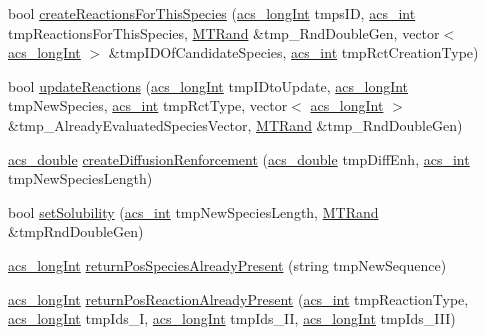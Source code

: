 \begin{DoxyCompactItemize}
\item 
bool \hyperlink{classenvironment_a76794f37d6d94b7504c58f0f4a4709ca}{create\-Reactions\-For\-This\-Species} (\hyperlink{acs__headers_8h_a19319d75f02db4308bc5c0026d98cd85}{acs\-\_\-long\-Int} tmps\-I\-D, \hyperlink{acs__headers_8h_a8d277355641a098190360234e2ebde35}{acs\-\_\-int} tmp\-Reactions\-For\-This\-Species, \hyperlink{class_m_t_rand}{M\-T\-Rand} \&tmp\-\_\-\-Rnd\-Double\-Gen, vector$<$ \hyperlink{acs__headers_8h_a19319d75f02db4308bc5c0026d98cd85}{acs\-\_\-long\-Int} $>$ \&tmp\-I\-D\-Of\-Candidate\-Species, \hyperlink{acs__headers_8h_a8d277355641a098190360234e2ebde35}{acs\-\_\-int} tmp\-Rct\-Creation\-Type)
\item 
bool \hyperlink{classenvironment_ace92235425bfbe692e3873ba5bb07639}{update\-Reactions} (\hyperlink{acs__headers_8h_a19319d75f02db4308bc5c0026d98cd85}{acs\-\_\-long\-Int} tmp\-I\-Dto\-Update, \hyperlink{acs__headers_8h_a19319d75f02db4308bc5c0026d98cd85}{acs\-\_\-long\-Int} tmp\-New\-Species, \hyperlink{acs__headers_8h_a8d277355641a098190360234e2ebde35}{acs\-\_\-int} tmp\-Rct\-Type, vector$<$ \hyperlink{acs__headers_8h_a19319d75f02db4308bc5c0026d98cd85}{acs\-\_\-long\-Int} $>$ \&tmp\-\_\-\-Already\-Evaluated\-Species\-Vector, \hyperlink{class_m_t_rand}{M\-T\-Rand} \&tmp\-\_\-\-Rnd\-Double\-Gen)
\item 
\hyperlink{acs__headers_8h_ab776853a005fcbf56af0424a2a4dd607}{acs\-\_\-double} \hyperlink{classenvironment_af795a4d1f04dfbfcbdf321e20e74f9c2}{create\-Diffusion\-Renforcement} (\hyperlink{acs__headers_8h_ab776853a005fcbf56af0424a2a4dd607}{acs\-\_\-double} tmp\-Diff\-Enh, \hyperlink{acs__headers_8h_a8d277355641a098190360234e2ebde35}{acs\-\_\-int} tmp\-New\-Species\-Length)
\item 
bool \hyperlink{classenvironment_a496ba50d3a345cd842ce42406946405c}{set\-Solubility} (\hyperlink{acs__headers_8h_a8d277355641a098190360234e2ebde35}{acs\-\_\-int} tmp\-New\-Species\-Length, \hyperlink{class_m_t_rand}{M\-T\-Rand} \&tmp\-Rnd\-Double\-Gen)
\item 
\hyperlink{acs__headers_8h_a19319d75f02db4308bc5c0026d98cd85}{acs\-\_\-long\-Int} \hyperlink{classenvironment_a4e26cc574e20a5afcfbbe5887109c5af}{return\-Pos\-Species\-Already\-Present} (string tmp\-New\-Sequence)
\item 
\hyperlink{acs__headers_8h_a19319d75f02db4308bc5c0026d98cd85}{acs\-\_\-long\-Int} \hyperlink{classenvironment_a6feec5685b519ba0cdae0e5c59dffff0}{return\-Pos\-Reaction\-Already\-Present} (\hyperlink{acs__headers_8h_a8d277355641a098190360234e2ebde35}{acs\-\_\-int} tmp\-Reaction\-Type, \hyperlink{acs__headers_8h_a19319d75f02db4308bc5c0026d98cd85}{acs\-\_\-long\-Int} tmp\-Ids\-\_\-\-I, \hyperlink{acs__headers_8h_a19319d75f02db4308bc5c0026d98cd85}{acs\-\_\-long\-Int} tmp\-Ids\-\_\-\-I\-I, \hyperlink{acs__headers_8h_a19319d75f02db4308bc5c0026d98cd85}{acs\-\_\-long\-Int} tmp\-Ids\-\_\-\-I\-I\-I)

\end{DoxyCompactItemize}

